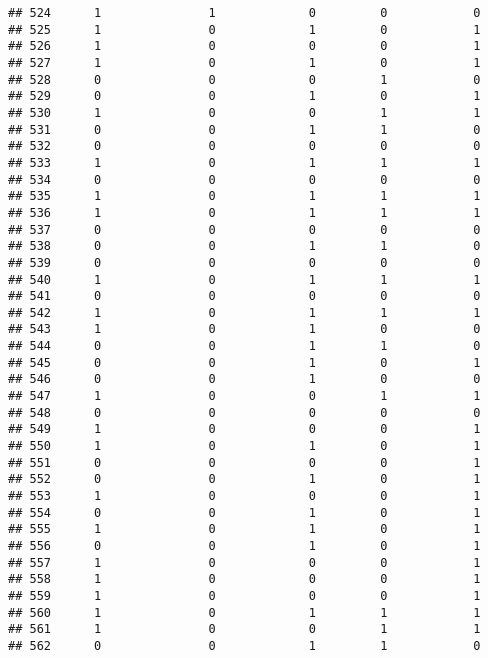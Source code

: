 \documentclass[]{article}
\begin{document}
\begin{verbatim}
## 524      1               1             0         0            0
## 525      1               0             1         0            1
## 526      1               0             0         0            1
## 527      1               0             1         0            1
## 528      0               0             0         1            0
## 529      0               0             1         0            1
## 530      1               0             0         1            1
## 531      0               0             1         1            0
## 532      0               0             0         0            0
## 533      1               0             1         1            1
## 534      0               0             0         0            0
## 535      1               0             1         1            1
## 536      1               0             1         1            1
## 537      0               0             0         0            0
## 538      0               0             1         1            0
## 539      0               0             0         0            0
## 540      1               0             1         1            1
## 541      0               0             0         0            0
## 542      1               0             1         1            1
## 543      1               0             1         0            0
## 544      0               0             1         1            0
## 545      0               0             1         0            1
## 546      0               0             1         0            0
## 547      1               0             0         1            1
## 548      0               0             0         0            0
## 549      1               0             0         0            1
## 550      1               0             1         0            1
## 551      0               0             0         0            1
## 552      0               0             1         0            1
## 553      1               0             0         0            1
## 554      0               0             1         0            1
## 555      1               0             1         0            1
## 556      0               0             1         0            1
## 557      1               0             0         0            1
## 558      1               0             0         0            1
## 559      1               0             0         0            1
## 560      1               0             1         1            1
## 561      1               0             0         1            1
## 562      0               0             1         1            0

\end{verbatim}
\end{document}
